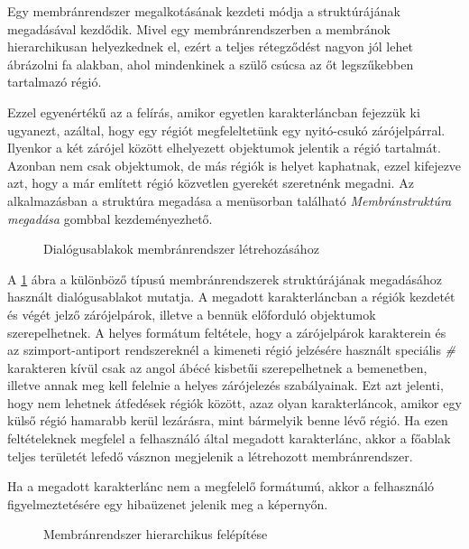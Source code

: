 Egy membránrendszer megalkotásának kezdeti módja a struktúrájának megadásával kezdődik. Mivel egy membránrendszerben a membránok hierarchikusan helyezkednek el, ezért a teljes rétegződést nagyon jól lehet ábrázolni fa alakban, ahol mindenkinek a szülő csúcsa az őt legszűkebben tartalmazó régió. 

Ezzel egyenértékű az a felírás, amikor egyetlen karakterláncban fejezzük ki ugyanezt, azáltal, hogy egy régiót megfeleltetünk egy nyitó-csukó zárójelpárral. Ilyenkor a két zárójel között elhelyezett objektumok jelentik a régió tartalmát. Azonban nem csak objektumok, de más régiók is helyet kaphatnak, ezzel kifejezve azt, hogy a már említett régió közvetlen gyerekét szeretnénk megadni. 
Az alkalmazásban a struktúra megadása a menüsorban található \textit{Membránstruktúra megadása} gombbal kezdeményezhető.

\begin{figure}[H]
	\centering
	\vspace{5pt}
	\caption{Dialógusablakok membránrendszer létrehozásához}
	\label{fig:create_system}
\end{figure}

A \ref{fig:create_system} ábra a különböző típusú membránrendszerek struktúrájának megadásához használt dialógusablakot mutatja. A megadott karakterláncban a régiók kezdetét és végét jelző zárójelpárok, illetve a bennük előforduló objektumok szerepelhetnek.
A helyes formátum feltétele, hogy a zárójelpárok karakterein és az szimport-antiport rendszereknél a kimeneti régió jelzésére használt speciális \textit{\#} karakteren kívül csak az angol ábécé kisbetűi szerepelhetnek a bemenetben, illetve annak meg kell felelnie a helyes zárójelezés szabályainak. Ezt azt jelenti, hogy nem lehetnek átfedések régiók között, azaz olyan karakterláncok, amikor egy külső régió hamarabb kerül lezárásra, mint bármelyik benne lévő régió. Ha ezen feltételeknek megfelel a felhasználó által megadott karakterlánc, akkor a főablak teljes területét lefedő vásznon megjelenik a létrehozott membránrendszer.

Ha a megadott karakterlánc nem a megfelelő formátumú, akkor a felhasználó figyelmeztetésére egy hibaüzenet jelenik meg a képernyőn. 

\begin{figure}
\centering
{}
\caption{Membránrendszer hierarchikus felépítése\protect\footnotemark}\label{fig:structure_graph}
\end{figure}

